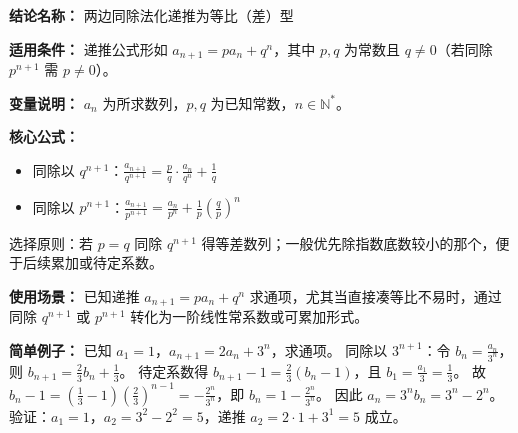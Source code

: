 \textbf{结论名称：} 两边同除法化递推为等比（差）型

\textbf{适用条件：} 递推公式形如 \(a_{n+1}=pa_n+q^n\)，其中 \(p,q\) 为常数且 \(q\neq0\)（若同除 \(p^{n+1}\) 需 \(p\neq0\)）。

\textbf{变量说明：} \(a_n\) 为所求数列，\(p,q\) 为已知常数，\(n\in\mathbb{N}^*\)。

\textbf{核心公式：}
\begin{itemize}
\item 同除以 \(q^{n+1}\)：\(\displaystyle \boxed{\frac{a_{n+1}}{q^{n+1}} = \frac{p}{q}\cdot\frac{a_n}{q^n} + \frac{1}{q}}\)
\item 同除以 \(p^{n+1}\)：\(\displaystyle \boxed{\frac{a_{n+1}}{p^{n+1}} = \frac{a_n}{p^n} + \frac{1}{p}\left(\frac{q}{p}\right)^n}\)
\end{itemize}
选择原则：若 \(p=q\) 同除 \(q^{n+1}\) 得等差数列；一般优先除指数底数较小的那个，便于后续累加或待定系数。

\textbf{使用场景：} 已知递推 \(a_{n+1}=pa_n+q^n\) 求通项，尤其当直接凑等比不易时，通过同除 \(q^{n+1}\) 或 \(p^{n+1}\) 转化为一阶线性常系数或可累加形式。

\textbf{简单例子：} 已知 \(a_1=1\)，\(a_{n+1}=2a_n+3^n\)，求通项。
同除以 \(3^{n+1}\)：令 \(b_n=\frac{a_n}{3^n}\)，则 \(b_{n+1}=\frac{2}{3}b_n+\frac{1}{3}\)。
待定系数得 \(b_{n+1}-1=\frac{2}{3}(b_n-1)\)，且 \(b_1=\frac{a_1}{3}=\frac{1}{3}\)。
故 \(b_n-1=\left(\frac{1}{3}-1\right)\left(\frac{2}{3}\right)^{n-1}=-\frac{2^n}{3^n}\)，即 \(b_n=1-\frac{2^n}{3^n}\)。
因此 \(a_n=3^n b_n=3^n-2^n\)。验证：\(a_1=1\)，\(a_2=3^2-2^2=5\)，递推 \(a_2=2\cdot1+3^1=5\) 成立。